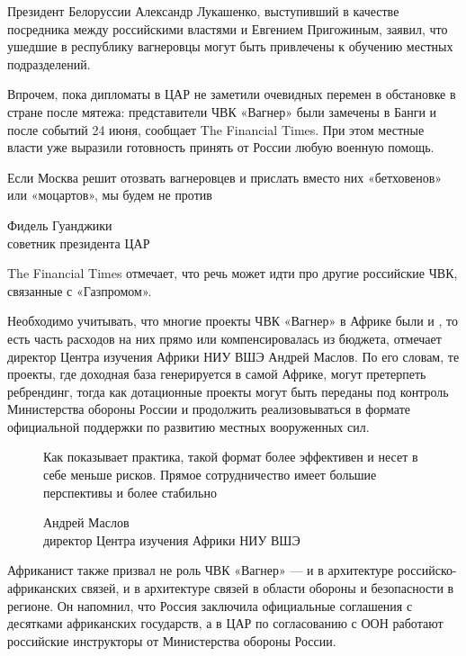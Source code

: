 Президент Белоруссии Александр Лукашенко, выступивший в качестве посредника между российскими властями и Евгением Пригожиным, заявил, что ушедшие в республику вагнеровцы могут быть привлечены к обучению местных подразделений.

Впрочем, пока дипломаты в ЦАР не заметили очевидных перемен в обстановке в стране после мятежа: представители ЧВК «Вагнер» были замечены в Банги и после событий 24 июня, сообщает The Financial Times. При этом местные власти уже выразили готовность принять от России любую военную помощь.

\begin{fancyquotes}
    Если Москва решит отозвать вагнеровцев и прислать вместо них «бетховенов» или «моцартов», мы будем не против

    \begin{flushright}
        Фидель Гуанджики\\
        советник президента ЦАР
    \end{flushright}
\end{fancyquotes}

The Financial Times отмечает, что речь может идти про другие российские ЧВК,  связанные с «Газпромом».

Необходимо учитывать, что многие проекты ЧВК «Вагнер» в Африке были  и , то есть часть расходов на них прямо или  компенсировалась из бюджета, отмечает директор Центра изучения Африки НИУ ВШЭ Андрей Маслов. По его словам, те проекты, где доходная база генерируется в самой Африке, могут претерпеть ребрендинг, тогда как дотационные проекты могут быть переданы под контроль Министерства обороны России и продолжить реализовываться в формате официальной поддержки по развитию местных вооруженных сил.

\begin{figure}
    \begin{fancyquotes}
        Как показывает практика, такой формат более эффективен и несет в себе меньше рисков. Прямое сотрудничество имеет большие перспективы и более стабильно

        \begin{flushright}
            Андрей Маслов\\
            директор Центра изучения Африки НИУ ВШЭ
        \end{flushright}
    \end{fancyquotes}
\end{figure}
Африканист также призвал не  роль ЧВК «Вагнер» --- и в архитектуре российско-африканских связей, и в архитектуре связей в области обороны и безопасности в регионе. Он напомнил, что Россия заключила официальные соглашения с десятками африканских государств, а в ЦАР по согласованию с ООН работают российские инструкторы от Министерства обороны России.

